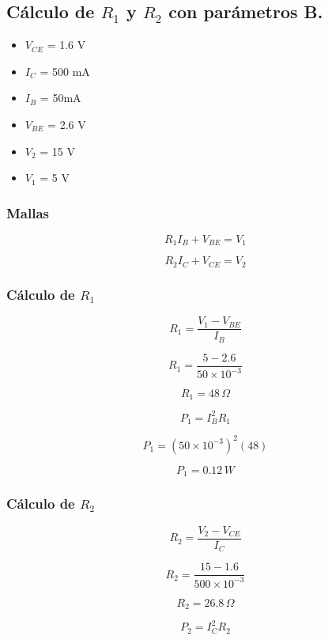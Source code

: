 \documentclass[journal]{IEEEtran}
\begin{document}
    \subsection{Cálculo de $R_1$ y $R_2$ con parámetros B.}
        \begin{itemize}
            \item $V_{CE}$ = 1.6 V
            \item $I_C$ = 500 mA
            \item $I_B$ = 50mA
            \item $V_{BE}$ = 2.6 V
            \item $V_2$ = 15 V
            \item $V_1$ = 5 V
        \end{itemize}
        \subsubsection{Mallas}

        \[
        R_1 I_B + V_{BE} = V_1
        \]

        \[
        R_2 I_C + V_{CE} = V_2
        \]

        \subsubsection{Cálculo de $R_1$}

        \[
        R_1 = \frac{V_1 - V_{BE}}{I_B}
        \]

        \[
        R_1 = \frac{5 - 2.6}{50 \times 10^{-3}}
        \]

        \[
        R_1 = 48\,\Omega
        \]

        \[
        P_1 = I_B^2 R_1
        \]

        \[
        P_1 = (50 \times 10^{-3})^2 (48)
        \]

        \[
        P_1 = 0.12\,W
        \]

        \subsubsection{Cálculo de $R_2$}

        \[
        R_2 = \frac{V_2 - V_{CE}}{I_C}
        \]

        \[
        R_2 = \frac{15 - 1.6}{500 \times 10^{-3}}
        \]

        \[
        R_2 = 26.8\,\Omega
        \]

        \[
        P_2 = I_C^2 R_2
        \]
\end{document}
